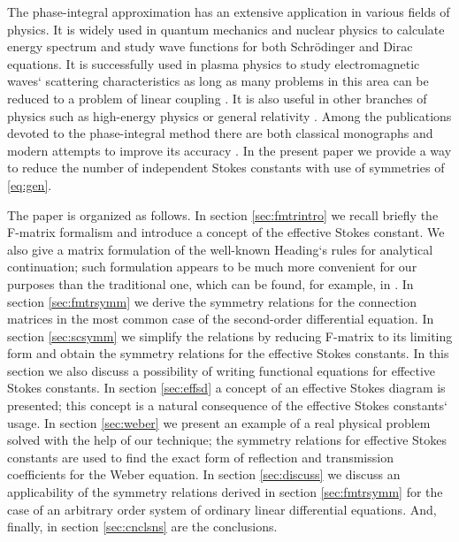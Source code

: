 \documentclass[atmp]{ipart_v1}
\newcommand\eref[1]{\eqref{#1}}
\newcommand\sref[1]{section \ref{#1}}
\begin{document}
The phase-integral approximation has an extensive application in various fields of physics.
It is widely used in quantum mechanics and nuclear physics to calculate energy spectrum and 
study wave functions for both  
Schr\"odinger \cite{serg96,serg02,aleixo00} 
and Dirac \cite{esp09} equations. 
It is successfully used in plasma physics to study electromagnetic waves` 
scattering characteristics \cite{gosp17, kut17}
as long as many problems in this area can be reduced to a problem of 
linear coupling \cite{shal08,shal10,shal12}. 
It is also useful in other branches of physics such as 
high-energy physics \cite{poor16} 
or general relativity \cite{ander92,manor77,rojas07}.
Among the publications devoted to the phase-integral method there are both 
classical monographs \cite{dingle73,berry91,rwbook,heading,frbook} 
and modern attempts to improve its accuracy \cite{ours,delabaere97}. 
In the present paper we provide a way to reduce the number 
of independent Stokes constants with use of symmetries of \eref{eq:gen}. 

The paper is organized as follows. 
In \sref{sec:fmtrintro} we recall briefly the F-matrix formalism and introduce a concept of the 
effective Stokes constant. We also give a matrix formulation of the well-known Heading`s rules for
analytical continuation; such formulation appears to be much more convenient for our purposes than 
the traditional one, which can be found, for example, in \cite{rwbook}.
In \sref{sec:fmtrsymm} we derive the symmetry relations for the connection matrices in the most common 
case of the second-order differential equation.
In \sref{sec:scsymm} we simplify the relations by reducing F-matrix to its limiting form and
obtain the symmetry relations for the effective Stokes constants. In this section we also discuss
a possibility of writing functional equations for effective Stokes constants.
In \sref{sec:effsd} a concept of an effective Stokes diagram is presented; this concept is a natural
consequence of the effective Stokes constants` usage.
In \sref{sec:weber} we present an example of a real physical problem solved with the help of our technique; 
the symmetry relations for effective Stokes constants are used to find the exact 
form of reflection and transmission coefficients for the Weber equation. 
In \sref{sec:discuss} we discuss an applicability of the symmetry relations derived in \sref{sec:fmtrsymm}
for the case of an arbitrary order system of ordinary linear differential equations.
And, finally, in \sref{sec:cnclsns} are the conclusions. 
\end{document}
